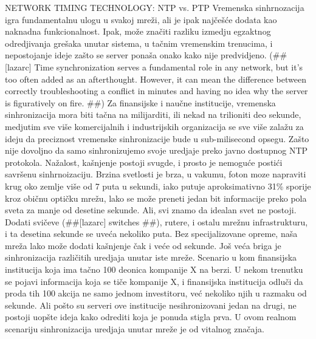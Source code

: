 \documentclass[a4paper,12pt, master]{etf}
\begin{document}
	NETWORK TIMING TECHNOLOGY: NTP vs. PTP
	Vremenska sinhrnozacija igra fundamentalnu ulogu u svakoj mre\v{z}i, ali je ipak naj\v{c}e\v{s}\'{c}e 
	dodata kao naknadna funkcionalnost. Ipak, mo\v{z}e zna\v{c}iti razliku izmedju egzaktnog 
	odredjivanja gre\v{s}aka unutar sistema, u ta\v{c}nim vremenskim trenucima, i nepostojanje ideje 
	za\v{s}to se server pona\v{s}a onako kako nije predvidjeno. (\#\#[lazarc] Time synchronization 
	serves a fundamental role in any network, but it's too often added as an afterthought. 
	However, it can mean the difference between correctly troubleshooting a conflict in 
	minutes and having no idea why the server is figuratively on fire. \#\#) Za finansijske i 
	nau\v{c}ne institucije, vremenska sinhronizacija mora biti ta\v{c}na na milijarditi, ili nekad na 
	trilioniti deo sekunde, medjutim sve vi\v{s}e komercijalnih i industrijskih organizacija se 
	sve vi\v{s}e zala\v{z}u za ideju da preciznost vremenske sinhronizacije bude u sub-milisecond 
	opsegu.	Za\v{s}to nije dovoljno da samo sinhronizujemo svoje uredjaje preko javno dostupnog NTP 
	protokola. Na\v{z}alost, ka\v{s}njenje postoji svugde, i prosto je nemogu\'{c}e posti\'{c}i savr\v{s}enu 
	sinhrnoizaciju. Brzina svetlosti je brza, u vakumu, foton moze napraviti krug oko zemlje 
	vi\v{s}e od 7 puta u sekundi, iako putuje aproksimativno 31\% sporije kroz obi\v{c}nu opti\v{c}ku 
	mre\v{z}u, lako se mo\v{z}e preneti jedan bit informacije preko pola sveta za manje od desetine 
	sekunde. Ali, svi znamo da idealan svet ne postoji. Dodati svi\v{c}eve (\#\#[lazarc] switches \#\#), 
	rutere, i ostalu mre\v{z}nu infrastrukturu, i ta desetina sekunde se uve\'{c}a nekoliko puta. Bez 
    specijalizovane opreme, na\v{s}a mre\v{z}a lako mo\v{z}e dodati ka\v{s}njenje \v{c}ak i ve\'{c}e od 
    sekunde. Jo\v{s} ve\'{c}a briga je sinhronizacija razli\v{c}itih uredjaja unutar iste mre\v{z}e. Scenario 
    u kom finansijska institucija koja ima ta\v{c}no 100 deonica kompanije X na berzi. U nekom trenutku 
	se pojavi informacija koja se ti\v{c}e kompanije X, i finansijska institucija odlu\v{c}i da proda 
	tih 100 akcija ne samo jednom investitoru, ve\'{c} nekoliko njih u razmaku od sekunde. Ali 
	po\v{s}to su serveri ove institucije nesihronizovani jedan na drugi, ne postoji uop\v{s}te ideja 
	kako odrediti koja je ponuda stigla prva. U ovom realnom scenariju sinhronizacija 
	uredjaja unutar mre\v{z}e je od vitalnog zna\v{c}aja.
\end{document}
